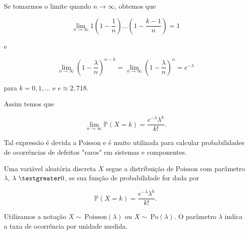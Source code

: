 \documentclass[10pt,a4paper]{article}
\begin{document}
Se tomarmos o limite quando $ n\rightarrow \infty $, obtemos que

\[\lim_{n\rightarrow \infty}1\left(1-\frac{1}{n}\right)\dots\left(1-\frac{k-1}{n}\right)=1\] 	

e

\[\lim_{n\rightarrow \infty}\left(1-\frac{\lambda}{n}\right)^{n-k}=\lim_{n\rightarrow \infty}\left(1-\frac{\lambda}{n}\right)^{n}=e^{-\lambda}\] 	

para $ k = 0,1,\ldots $ e $ e\approx 2,718 $.

Assim temos que 

\[\lim_{n\rightarrow \infty}\mathbb{P}(X=k)=\frac{e^{-\lambda}\lambda^k}{k!}.\] 	

Tal expressão é devida a Poisson e é muito utilizada para calcular probabilidades de ocorrências de defeitos "raros" em sistemas e componentes.

\begin{df}
	Uma variável aleatória discreta $ X $ segue a distribuição de Poisson com parâmetro $ \lambda $, $ \lambda \ \textgreater 0 $, se sua função de probabilidade for dada por

	\[\mathbb{P}(X=k)=\frac{e^{-\lambda}\lambda^k}{k!}.\] 	

	Utilizamos a notação $ X \sim \ \text{Poisson}(\lambda) $ ou $ X\sim \ \text{Po}(\lambda) $. O parâmetro $ \lambda $ indica a taxa de ocorrência por unidade medida.
\end{df}
\end{document}
